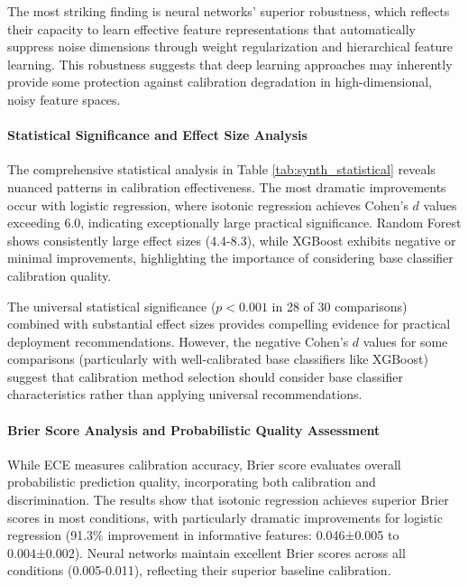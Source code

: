 \documentclass[12pt, a4paper]{article}
\begin{document}
The most striking finding is neural networks' superior robustness, which reflects their capacity to learn effective feature representations that automatically suppress noise dimensions through weight regularization and hierarchical feature learning. This robustness suggests that deep learning approaches may inherently provide some protection against calibration degradation in high-dimensional, noisy feature spaces.

\paragraph{Statistical Significance and Effect Size Analysis}

The comprehensive statistical analysis in Table \ref{tab:synth_statistical} reveals nuanced patterns in calibration effectiveness. The most dramatic improvements occur with logistic regression, where isotonic regression achieves Cohen's $d$ values exceeding 6.0, indicating exceptionally large practical significance. Random Forest shows consistently large effect sizes (4.4-8.3), while XGBoost exhibits negative or minimal improvements, highlighting the importance of considering base classifier calibration quality.

The universal statistical significance ($p < 0.001$ in 28 of 30 comparisons) combined with substantial effect sizes provides compelling evidence for practical deployment recommendations. However, the negative Cohen's $d$ values for some comparisons (particularly with well-calibrated base classifiers like XGBoost) suggest that calibration method selection should consider base classifier characteristics rather than applying universal recommendations.

\paragraph{Brier Score Analysis and Probabilistic Quality Assessment}

While ECE measures calibration accuracy, Brier score evaluates overall probabilistic prediction quality, incorporating both calibration and discrimination. The results show that isotonic regression achieves superior Brier scores in most conditions, with particularly dramatic improvements for logistic regression (91.3\% improvement in informative features: 0.046±0.005 to 0.004±0.002). Neural networks maintain excellent Brier scores across all conditions (0.005-0.011), reflecting their superior baseline calibration.
\end{document}
